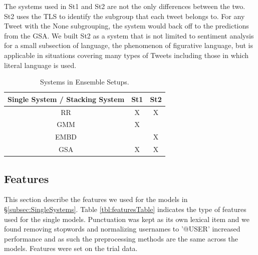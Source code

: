 \documentclass[11pt,letterpaper]{article}
\begin{document}
The systems used in {\sc St1} and {\sc St2} are not the only differences between the two. {\sc St2} uses the TLS to identify the subgroup that each tweet belongs to. For any Tweet with the {\sc None} subgrouping, the system would back off to the predictions from the GSA. We built {\sc St2} as a system that is not limited to sentiment analysis for a small subsection of language, the phenomenon of figurative language, but is applicable in situations covering many types of Tweets including those in which literal language is used.

\begin{table}[ht!]
\begin{center}
\begin{tabular}{c || c c}
Single System / Stacking System & {\sc St1} & {\sc St2}\\
\hline
{\sc RR} & X & X\\
{\sc GMM} & X & \\
{\sc EMBD} & &X\\
{\sc GSA} & X&X \\
\end{tabular}
\end{center}
\caption{Systems in Ensemble Setups.}
\label{tbl:stackingTable}
\end{table}

\subsection{Features}

\label{sec:Features}

This section describe the features we used for the models in \S \ref{subsec:SingleSystems}. Table \ref{tbl:featuresTable} indicates the type of features used for the single models. Punctuation was kept as its own lexical item and we found removing stopwords and normalizing usernames to '@USER'  increased performance and as such the preprocessing methods are the same across the models. Features were set on the trial data.%
\end{document}
